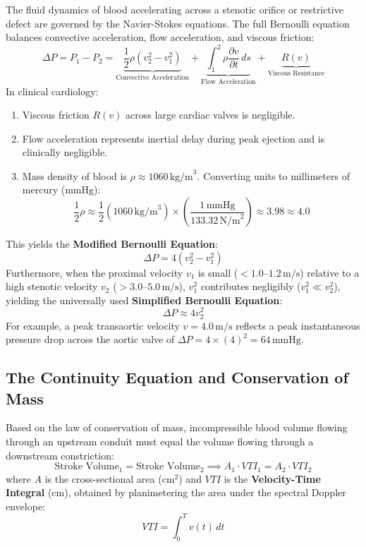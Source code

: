 \documentclass[11pt,a4paper]{article}
\begin{document}
The fluid dynamics of blood accelerating across a stenotic orifice or restrictive defect are governed by the Navier-Stokes equations. The full Bernoulli equation balances convective acceleration, flow acceleration, and viscous friction:
\begin{equation}
    \Delta P = P_1 - P_2 = \underbrace{\frac{1}{2} \rho \left( v_2^2 - v_1^2 \right)}_{\text{Convective Acceleration}} + \underbrace{\int_1^2 \rho \frac{\partial v}{\partial t} \, ds}_{\text{Flow Acceleration}} + \underbrace{R(v)}_{\text{Viscous Resistance}}
\end{equation}
In clinical cardiology:
\begin{enumerate}[leftmargin=*]
    \item Viscous friction $R(v)$ across large cardiac valves is negligible.
    \item Flow acceleration represents inertial delay during peak ejection and is clinically negligible.
    \item Mass density of blood is $\rho \approx 1060\,\text{kg/m}^3$. Converting units to millimeters of mercury ($\text{mmHg}$):
    \begin{equation}
        \frac{1}{2} \rho \approx \frac{1}{2} (1060\,\text{kg/m}^3) \times \left( \frac{1\,\text{mmHg}}{133.32\,\text{N/m}^2} \right) \approx 3.98 \approx 4.0
    \end{equation}
\end{enumerate}
This yields the \textbf{Modified Bernoulli Equation}:
\begin{equation}
    \Delta P = 4 \left( v_2^2 - v_1^2 \right)
\end{equation}
Furthermore, when the proximal velocity $v_1$ is small ($< 1.0\text{--}1.2\,\text{m/s}$) relative to a high stenotic velocity $v_2$ ($> 3.0\text{--}5.0\,\text{m/s}$), $v_1^2$ contributes negligibly ($v_1^2 \ll v_2^2$), yielding the universally used \textbf{Simplified Bernoulli Equation}:
\begin{equation}
    \Delta P \approx 4 v_2^2
\end{equation}
For example, a peak transaortic velocity $v = 4.0\,\text{m/s}$ reflects a peak instantaneous pressure drop across the aortic valve of $\Delta P = 4 \times (4)^2 = 64\,\text{mmHg}$.

\subsection{The Continuity Equation and Conservation of Mass}

Based on the law of conservation of mass, incompressible blood volume flowing through an upstream conduit must equal the volume flowing through a downstream constriction:
\begin{equation}
    \text{Stroke Volume}_1 = \text{Stroke Volume}_2 \implies A_1 \cdot VTI_1 = A_2 \cdot VTI_2
\end{equation}
where $A$ is the cross-sectional area ($\text{cm}^2$) and $VTI$ is the \textbf{Velocity-Time Integral} ($\text{cm}$), obtained by planimetering the area under the spectral Doppler envelope:
\begin{equation}
    VTI = \int_0^T v(t) \, dt
\end{equation}
\end{document}
